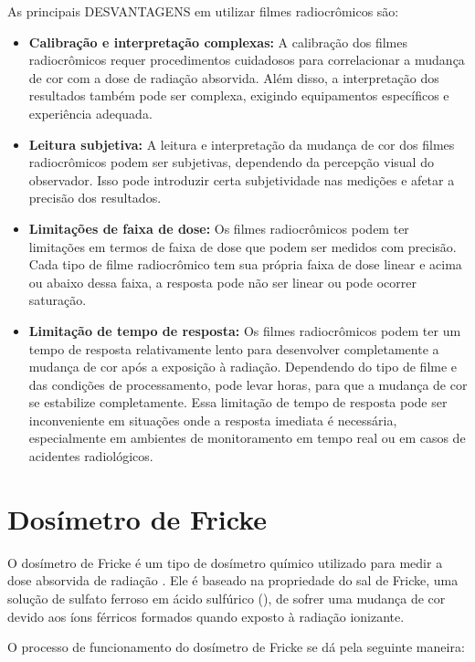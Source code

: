 \documentclass[11pt,a4paper]{article}
\begin{document}
		As principais \textcolor{CarnationPink}{DESVANTAGENS} em utilizar filmes radiocrômicos são:

		\begin{itemize}[label=\textcolor{CarnationPink}{$\blacktriangleright$}]
			\item \textbf{Calibração e interpretação complexas:} A calibração dos filmes radiocrômicos requer procedimentos cuidadosos para correlacionar a mudança de cor com a dose de radiação absorvida. Além disso, a interpretação dos resultados também pode ser complexa, exigindo equipamentos específicos e experiência adequada.
			\item \textbf{Leitura subjetiva:} A leitura e interpretação da mudança de cor dos filmes radiocrômicos podem ser subjetivas, dependendo da percepção visual do observador. Isso pode introduzir certa subjetividade nas medições e afetar a precisão dos resultados.
			\item \textbf{Limitações de faixa de dose:} Os filmes radiocrômicos podem ter limitações em termos de faixa de dose que podem ser medidos com precisão. Cada tipo de filme radiocrômico tem sua própria faixa de dose linear e acima ou abaixo dessa faixa, a resposta pode não ser linear ou pode ocorrer saturação.
			\item \textbf{Limitação de tempo de resposta:} Os filmes radiocrômicos podem ter um tempo de resposta relativamente lento para desenvolver completamente a mudança de cor após a exposição à radiação. Dependendo do tipo de filme e das condições de processamento, pode levar horas, para que a mudança de cor se estabilize completamente. Essa limitação de tempo de resposta pode ser inconveniente em situações onde a resposta imediata é necessária, especialmente em ambientes de monitoramento em tempo real ou em casos de acidentes radiológicos.
		\end{itemize}


	\section{Dosímetro de Fricke}

		O dosímetro de Fricke é um tipo de dosímetro químico utilizado para medir a dose absorvida de radiação . Ele é baseado na propriedade do sal de Fricke, uma solução de sulfato ferroso  em ácido sulfúrico (), de sofrer uma mudança de cor devido aos íons férricos formados quando exposto à radiação ionizante.

		O processo de funcionamento do dosímetro de Fricke se dá pela seguinte maneira:
\end{document}
